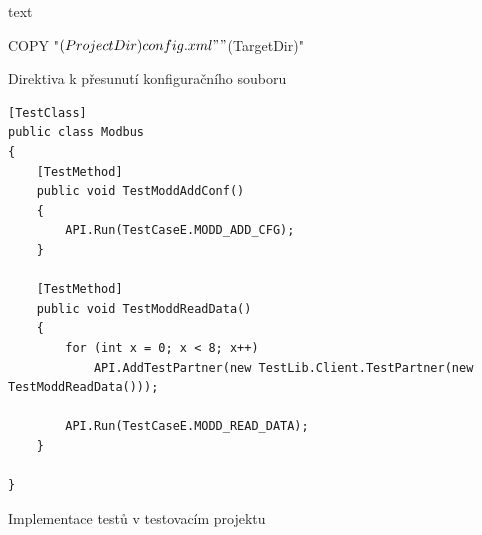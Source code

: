 \begin{listing}[p]
    \centering
    \begin{cminted}[breaklines,stripnl=false]{text}

COPY "$(ProjectDir)config.xml"  "$(TargetDir)"

    \end{cminted}
\caption{Direktiva k přesunutí konfiguračního souboru}
\label{listing:postbuild}
\end{listing}

\begin{listing}[p]
    \centering
    \begin{verbatim}
[TestClass]
public class Modbus
{
    [TestMethod]
    public void TestModdAddConf()
    {
        API.Run(TestCaseE.MODD_ADD_CFG);
    }
    
    [TestMethod]
    public void TestModdReadData()
    {
        for (int x = 0; x < 8; x++)
            API.AddTestPartner(new TestLib.Client.TestPartner(new TestModdReadData()));
    
        API.Run(TestCaseE.MODD_READ_DATA);
    }
    
}
    \end{verbatim}
\caption{Implementace testů v testovacím projektu}
\label{listing:testcase_service}
\end{listing}


